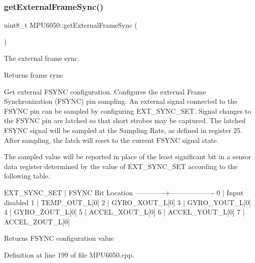 \subsubsection{\texorpdfstring{getExternalFrameSync()}{getExternalFrameSync()}}
{\footnotesize\ttfamily uint8\+\_\+t M\+P\+U6050\+::get\+External\+Frame\+Sync (\begin{DoxyParamCaption}{ }\end{DoxyParamCaption})}

The external frame sync.

\begin{DoxyReturn}{Returns}
frame sync
\end{DoxyReturn}
Get external F\+S\+Y\+NC configuration. Configures the external Frame Synchronization (F\+S\+Y\+NC) pin sampling. An external signal connected to the F\+S\+Y\+NC pin can be sampled by configuring E\+X\+T\+\_\+\+S\+Y\+N\+C\+\_\+\+S\+ET. Signal changes to the F\+S\+Y\+NC pin are latched so that short strobes may be captured. The latched F\+S\+Y\+NC signal will be sampled at the Sampling Rate, as defined in register 25. After sampling, the latch will reset to the current F\+S\+Y\+NC signal state.

The sampled value will be reported in place of the least significant bit in a sensor data register determined by the value of E\+X\+T\+\_\+\+S\+Y\+N\+C\+\_\+\+S\+ET according to the following table.


\begin{DoxyPre}
EXT\_SYNC\_SET | FSYNC Bit Location
-------------+-------------------
0            | Input disabled
1            | TEMP\_OUT\_L[0]
2            | GYRO\_XOUT\_L[0]
3            | GYRO\_YOUT\_L[0]
4            | GYRO\_ZOUT\_L[0]
5            | ACCEL\_XOUT\_L[0]
6            | ACCEL\_YOUT\_L[0]
7            | ACCEL\_ZOUT\_L[0]
\end{DoxyPre}


\begin{DoxyReturn}{Returns}
F\+S\+Y\+NC configuration value 
\end{DoxyReturn}


Definition at line 199 of file M\+P\+U6050.\+cpp.


